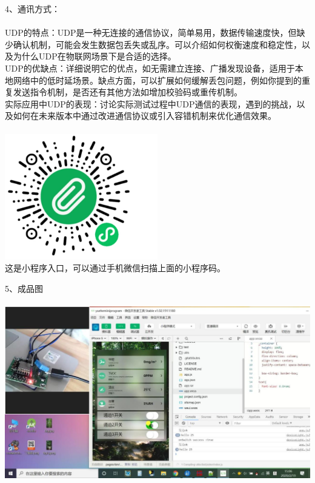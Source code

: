 \documentclass[16pt]{beamer}	%
\begin{document}
		\begin{frame}
			\small4、通讯方式：	\\ \hspace*{\fill} 
			\scriptsize	\\ UDP的特点：UDP是一种无连接的通信协议，简单易用，数据传输速度快，但缺少确认机制，可能会发生数据包丢失或乱序。可以介绍如何权衡速度和稳定性，以及为什么UDP在物联网场景下是合适的选择。
			\\UDP的优缺点：详细说明它的优点，如无需建立连接、广播发现设备，适用于本地网络中的低时延场景。缺点方面，可以扩展如何缓解丢包问题，例如你提到的重复发送指令机制，是否还有其他方法如增加校验码或重传机制。
			\\实际应用中UDP的表现：讨论实际测试过程中UDP通信的表现，遇到的挑战，以及如何在未来版本中通过改进通信协议或引入容错机制来优化通信效果。
			\\ \hspace*{\fill} \\ \includegraphics[width=0.5\textwidth]{pic/3-3.png}
			\\这是小程序入口，可以通过手机微信扫描上面的小程序码。
		\end{frame}
		\begin{frame}
		\small 	5、成品图\\ \hspace*{\fill}
		\\ \includegraphics[width=1.0\textwidth]{pic/3-4.png}
		\end{frame}
		
\end{document}
